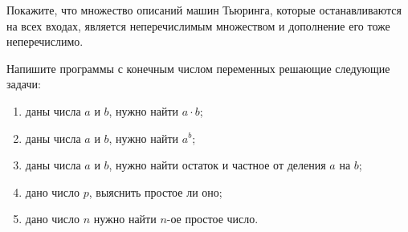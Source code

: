 \breakline


\begin{ptask}{14}
    Покажите, что множество описаний машин Тьюринга, которые останавливаются на всех входах, является неперечислимым множеством и
    дополнение его тоже неперечислимо.
\end{ptask}

\begin{ptask}{16}
	Напишите программы с конечным числом переменных решающие следующие задачи:
	\begin{enumerate}
		\item даны числа $a$ и $b$, нужно найти $a \cdot b$;
		\item даны числа $a$ и $b$, нужно найти $a^b$;
		\item даны числа $a$ и $b$, нужно найти остаток и частное от деления $a$ на $b$;
		\item дано число $p$, выяснить простое ли оно;
		\item дано число $n$ нужно найти $n$-ое простое число.
	\end{enumerate}
\end{ptask}